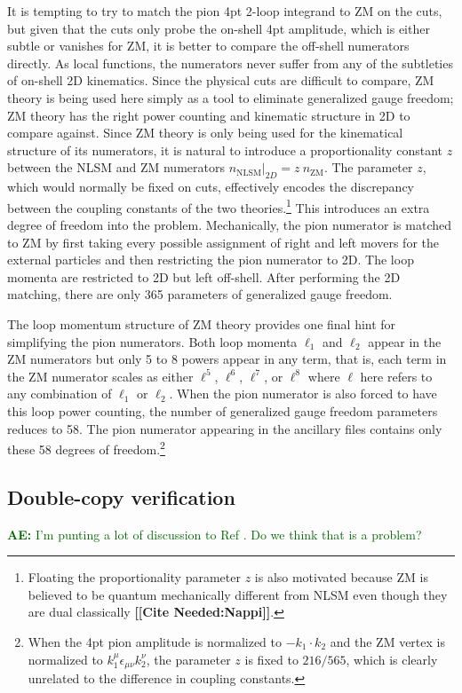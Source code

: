 \documentclass[11pt,letter]{article}
\newcommand{\ace}[1]{\textcolor{darkgreen}{\textbf{AE:}{ #1}}}
\newcommand{\citepls}[1]{{\bf\color{red}[[Cite Needed:#1]]}}
\begin{document}
It is tempting to try to match the pion 4pt 2-loop integrand to ZM on the cuts, but given that the cuts only probe the on-shell 4pt amplitude, which is either subtle or vanishes for ZM, it is better to compare the off-shell numerators directly.
As local functions, the numerators never suffer from any of the subtleties of on-shell 2D kinematics.
Since the physical cuts are difficult to compare, ZM theory is being used here simply as a tool to eliminate generalized gauge freedom; ZM theory has the right power counting and kinematic structure in 2D to compare against.
Since ZM theory is only being used for the kinematical structure of its numerators, it is natural to introduce a proportionality constant $z$ between the NLSM and ZM numerators $n_\text{NLSM} \vert_{2D} = z ~ n_\text{ZM}$.
The parameter $z$, which would normally be fixed on cuts, effectively encodes the discrepancy between the coupling constants of the two theories.\footnote{Floating the proportionality parameter $z$ is also motivated because ZM is believed to be quantum mechanically different from NLSM even though they are dual classically \citepls{Nappi}.}
This introduces an extra degree of freedom into the problem.
Mechanically, the pion numerator is matched to ZM by first taking every possible assignment of right and left movers for the external particles and then restricting the pion numerator to 2D.
The loop momenta are restricted to 2D but left off-shell.
After performing the 2D matching, there are only 365 parameters of generalized gauge freedom.

The loop momentum structure of ZM theory provides one final hint for simplifying the pion numerators.
Both loop momenta $\ell_1$ and $\ell_2$ appear in the ZM numerators but only 5 to 8 powers appear in any term, that is, each term in the ZM numerator scales as either $\ell^5$, $\ell^6$, $\ell^7$, or $\ell^8$ where $\ell$ here refers to any combination of $\ell_1$ or $\ell_2$.
When the pion numerator is also forced to have this loop power counting, the number of generalized gauge freedom parameters reduces to 58.
The pion numerator appearing in the ancillary files contains only these 58 degrees of freedom.\footnote{When the 4pt pion amplitude is normalized to $-k_1\cdot k_2$ and the ZM vertex is normalized to $k_1^\mu \epsilon_{\mu\nu}k_2^\nu$, the parameter $z$ is fixed to $216/565$, which is clearly unrelated to the difference in coupling constants.}

\subsection{Double-copy verification}
\ace{I'm punting a lot of discussion to Ref \cite{Carrasco:2023qgz}.
  Do we think that is a problem?}
\end{document}
